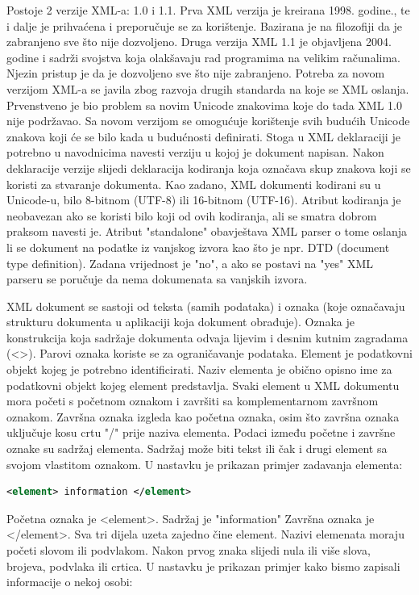 \documentclass{foi}
\begin{document}
Postoje 2 verzije XML-a: 1.0 i 1.1. Prva XML verzija je kreirana 1998. godine., te i dalje je prihvaćena i preporučuje se za korištenje. Bazirana je na filozofiji da je zabranjeno sve što nije dozvoljeno. Druga verzija XML 1.1 je objavljena 2004. godine i sadrži svojstva koja olakšavaju rad programima na velikim računalima. Njezin pristup je da je dozvoljeno sve što nije zabranjeno. Potreba za novom verzijom XML-a se javila zbog razvoja drugih standarda na koje se XML oslanja. Prvenstveno je bio problem sa novim Unicode znakovima koje do tada XML 1.0 nije podržavao. Sa novom verzijom se omogućuje korištenje svih budućih Unicode znakova koji će se bilo kada u budućnosti definirati. Stoga u XML deklaraciji je potrebno u navodnicima navesti verziju u kojoj je dokument napisan. Nakon deklaracije verzije slijedi deklaracija kodiranja koja označava skup znakova koji se koristi za stvaranje dokumenta. Kao zadano, XML dokumenti kodirani su u Unicode-u, bilo 8-bitnom (UTF-8) ili 16-bitnom (UTF-16). Atribut kodiranja je neobavezan ako se koristi bilo koji od ovih kodiranja, ali se smatra dobrom praksom navesti je.  Atribut "standalone" obavještava XML parser o tome oslanja li se dokument na podatke iz vanjskog izvora kao što je npr. DTD (document type definition). Zadana vrijednost je "no", a ako se postavi na "yes" XML parseru se poručuje da nema dokumenata sa vanjskih izvora.

XML dokument se sastoji od teksta (samih podataka) i oznaka (koje označavaju strukturu dokumenta u aplikaciji koja dokument obrađuje).  Oznaka je konstrukcija koja sadržaje dokumenta odvaja lijevim i desnim kutnim zagradama (<>). Parovi oznaka koriste se za ograničavanje podataka. Element je podatkovni objekt kojeg je potrebno identificirati. Naziv elementa je obično opisno ime za podatkovni objekt kojeg element predstavlja. Svaki element u XML dokumentu mora početi s početnom oznakom i završiti sa komplementarnom završnom oznakom. Završna oznaka izgleda kao početna oznaka, osim što završna oznaka uključuje kosu crtu "/" prije naziva elementa. Podaci između početne i završne oznake su sadržaj elementa. Sadržaj može biti tekst ili čak i drugi element sa svojom vlastitom oznakom. U nastavku je prikazan primjer zadavanja elementa:

\begin{lstlisting}[language=XML]
<element> information </element>
\end{lstlisting}

Početna oznaka je <element>. Sadržaj je "information" Završna oznaka je </element>. Sva tri dijela uzeta zajedno čine element. Nazivi elemenata moraju početi slovom ili podvlakom. Nakon prvog znaka slijedi nula ili više slova, brojeva, podvlaka ili crtica. \cite{xmlSoapProgramming} U nastavku je prikazan primjer kako bismo zapisali informacije o nekoj osobi:
\end{document}
